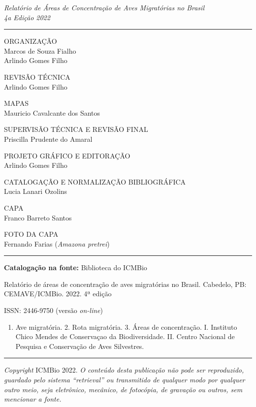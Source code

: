 \documentclass[
  oneside]{scrbook}
\providecommand{\tightlist}{%
  \setlength{\itemsep}{0pt}\setlength{\parskip}{0pt}}
\begin{document}
\emph{Relatório de Áreas de Concentração de Aves Migratórias no Brasil}\\
\emph{4a Edição \textbar{} 2022}

\begin{center}\rule{0.5\linewidth}{0.5pt}\end{center}

ORGANIZAÇÃO\\
Marcos de Souza Fialho\\
Arlindo Gomes Filho~

REVISÃO TÉCNICA\\
Arlindo Gomes Filho~

MAPAS\\
Mauricio Cavalcante dos Santos~

SUPERVISÃO TÉCNICA E REVISÃO FINAL\\
Priscilla Prudente do Amaral~

PROJETO GRÁFICO E EDITORAÇÃO\\
Arlindo Gomes Filho~

CATALOGAÇÃO E NORMALIZAÇÃO BIBLIOGRÁFICA\\
Lucia Lanari Ozolins~

CAPA\\
Franco Barreto Santos~

FOTO DA CAPA\\
Fernando Farias (\emph{Amazona pretrei})~

\begin{center}\rule{0.5\linewidth}{0.5pt}\end{center}

\textbf{Catalogação na fonte:} Biblioteca do ICMBio

Relatório de áreas de concentração de aves migratórias no Brasil. Cabedelo, PB: CEMAVE/ICMBio. 2022. 4ª edição

ISSN: 2446-9750 (versão \emph{on-line})

\begin{enumerate}
\def\labelenumi{\arabic{enumi}.}
\tightlist
\item
  Ave migratória. 2. Rota migratória. 3. Áreas de concentração. I. Instituto Chico Mendes de Conservaçao da Biodiversidade. II. Centro Nacional de Pesquisa e Conservação de Aves Silvestres.
\end{enumerate}

\begin{center}\rule{0.5\linewidth}{0.5pt}\end{center}

\emph{Copyright} ICMBio 2022. \emph{O conteúdo desta publicação não pode ser reproduzido, guardado pelo sistema ``retrieval'' ou transmitido de qualquer modo por qualquer outro meio, seja eletrônico, mecânico, de fotocópia, de gravação ou outros, sem mencionar a fonte.}
\end{document}
